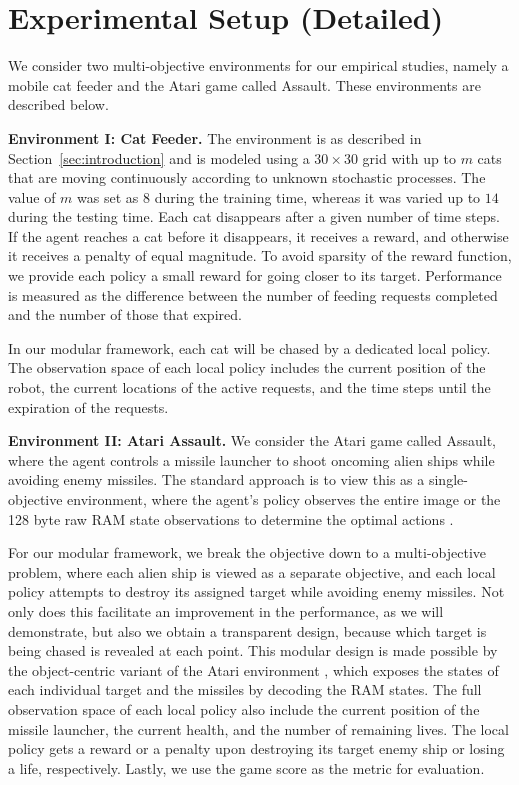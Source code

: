\section{Experimental Setup (Detailed)}
\label{app:experimental setup}

We consider two multi-objective environments for our empirical studies, namely a mobile cat feeder and the Atari game called Assault.
These environments are described below.

\textbf{Environment I: Cat Feeder.} 
The environment is as described in Section~\ref{sec:introduction} and is modeled using a $30\times 30$ grid with up to $m$ cats that are moving continuously according to unknown stochastic processes.
The value of $m$ was set as $8$ during the training time, whereas it was varied up to $14$ during the testing time.
Each cat disappears after a given number of time steps.
If the agent reaches a cat before it disappears, it receives a reward, and otherwise it receives a penalty of equal magnitude.
To avoid sparsity of the reward function, we provide each policy a small reward for going closer to its target.
Performance is measured as the difference between the number of feeding requests completed and the number of those that expired.

In our modular framework, each cat will be chased by a dedicated local policy.
The observation space of each local policy includes the current position of the robot, the current locations of the active requests, and the time steps until the expiration of the requests.

\textbf{Environment II: Atari Assault.} We consider the Atari game called Assault, where the agent controls a missile launcher to shoot oncoming alien ships while avoiding enemy missiles. The standard approach is to view this as a single-objective environment, where the agent's policy observes the entire image or the 128 byte raw RAM state observations to determine the optimal actions \citep{bellemare13arcade}. 

For our modular framework, we break the objective down to a multi-objective problem, where each alien ship is viewed as a separate objective, and each local policy attempts to destroy its assigned target while avoiding enemy missiles. 
Not only does this facilitate an improvement in the performance, as we will demonstrate, but also we obtain a transparent design, because which target is being chased is revealed at each point. 
This modular design is made possible by the object-centric variant of the Atari environment \citep{delfosse2023ocatari}, which exposes the states of each individual target and the missiles by decoding the RAM states. 
The full observation space of each local policy also include the current position of the missile launcher, the current health, and the number of remaining lives. 
The local policy gets a reward or a penalty upon destroying its target enemy ship or losing a life, respectively. 
Lastly, we use the game score as the metric for evaluation.


